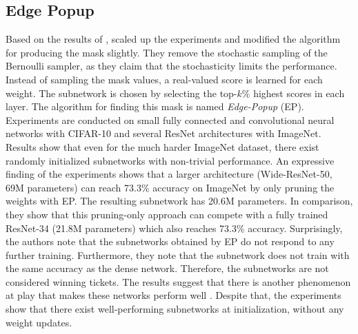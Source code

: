 \subsection{Edge Popup}
Based on the results of \autocite{Supermasks}, \textcite{EdgePopup} scaled up the experiments and modified the algorithm for producing the mask slightly.
They remove the stochastic sampling of the Bernoulli sampler, as they claim that the stochasticity limits the performance. 
Instead of sampling the mask values, a real-valued score is learned for each weight. 
The subnetwork is chosen by selecting the top-$k$\% highest scores in each layer.
The algorithm for finding this mask is named \textit{Edge-Popup} (EP).
Experiments are conducted on small fully connected and convolutional neural networks with CIFAR-10 and several ResNet architectures with ImageNet.
Results show that even for the much harder ImageNet dataset, there exist randomly initialized subnetworks with non-trivial performance. 
An expressive finding of the experiments shows that a larger architecture (Wide-ResNet-50, 69M parameters) can reach 73.3\% accuracy on ImageNet by only pruning the weights with {EP}.
The resulting subnetwork has 20.6M parameters. In comparison, they show that this pruning-only approach can compete with a fully trained ResNet-34 (21.8M parameters) which also reaches 73.3\% accuracy. 
Surprisingly, the authors note that the subnetworks obtained by EP do not respond to any further training.
Furthermore, they note that the subnetwork does not train with the same accuracy as the dense network.
Therefore, the subnetworks are not considered winning tickets.
The results suggest that there is another phenomenon at play that makes these networks perform well \autocite{EdgePopup}.
Despite that, the experiments show that there exist well-performing subnetworks at initialization, without any weight updates.

